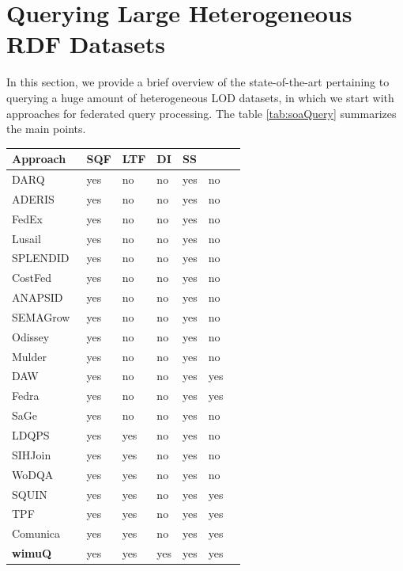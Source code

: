 \section{Querying Large Heterogeneous RDF Datasets}
In this section, we provide a brief overview of the state-of-the-art pertaining to querying a huge amount of heterogeneous LOD datasets, in which we start with approaches for federated query processing. The table \ref{tab:soaQuery} summarizes the main points.

\begin{table}[H]
\caption{State of the art overview regarding to Querying Large Heterogeneous RDF Datasets, withing the following characteristics: SPARQL query federation (SQF), Link Traversal based SPARQL federation (LTF), Dataset Identification (DI), Source Selection (SS), Duplicate Aware (DA)}
\label{tab:soaQuery}
\begin{center}
\begin{longtable}{@{}lllllll@{}}
\toprule
\textbf{Approach} & \textbf{SQF} & \textbf{LTF} & \textbf{DI} & \textbf{SS}\\ \midrule
DARQ~\cite{darq2008} & yes & no & no & yes & no\\
ADERIS~\cite{aderis2011} & yes & no & no & yes & no\\
FedEx~\cite{fedx2011} & yes & no & no & yes & no\\
Lusail~\cite{abdelaziz2017lusail} & yes & no & no & yes & no\\
SPLENDID~\cite{splendid2011} & yes & no & no & yes & no\\
CostFed~\cite{saleem2018costfed} & yes & no & no & yes & no\\
ANAPSID~\cite{anapsid2011} & yes & no & no & yes & no\\
SEMAGrow~\cite{semagrow2015} & yes & no & no & yes & no\\
Odissey~\cite{odyssey2017} & yes & no & no & yes & no\\
Mulder~\cite{endris2018querying} & yes & no & no & yes & no\\
DAW~\cite{daw2013} & yes & no & no & yes & yes\\
Fedra~\cite{fedra2015} & yes & no & no & yes & yes\\
SaGe~\cite{DBLP:journals/corr/abs-1806-00227} & yes & no & no & yes & no\\
LDQPS~\cite{ldqp2010} & yes & yes & no & yes & no\\
SIHJoin~\cite{sihjoin2011} & yes & yes & no & yes & no\\
WoDQA~\cite{wodqa2012} & yes & yes & no & yes & no\\
SQUIN~\cite{hartig2013squin} & yes & yes & no & yes & yes\\
TPF~\cite{verborgh2016triple} & yes & yes & no & yes & yes\\
Comunica~\cite{taelman2018comunica} & yes & yes & no & yes & yes\\
\textbf{wimuQ}~\cite{ValdestilhasKcap} & yes & yes & yes & yes & yes\\
\bottomrule
\end{longtable}
\end{center}
\end{table}

